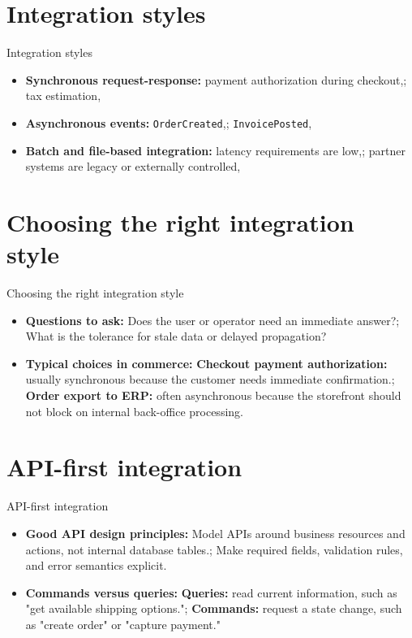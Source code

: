 \documentclass[aspectratio=169]{beamer}
\begin{document}
\section{Integration styles}

\begin{frame}{Integration styles}
  \begin{itemize}
    \item \textbf{Synchronous request-response:} payment authorization during checkout,; tax estimation,
    \item \textbf{Asynchronous events:} \texttt{OrderCreated},; \texttt{InvoicePosted},
    \item \textbf{Batch and file-based integration:} latency requirements are low,; partner systems are legacy or externally controlled,
  \end{itemize}
\end{frame}

\section{Choosing the right integration style}

\begin{frame}{Choosing the right integration style}
  \begin{itemize}
    \item \textbf{Questions to ask:} Does the user or operator need an immediate answer?; What is the tolerance for stale data or delayed propagation?
    \item \textbf{Typical choices in commerce:} \textbf{Checkout payment authorization:} usually synchronous because the customer needs immediate confirmation.; \textbf{Order export to ERP:} often asynchronous because the storefront should not block on internal back-office processing.
  \end{itemize}
\end{frame}

\section{API-first integration}

\begin{frame}{API-first integration}
  \begin{itemize}
    \item \textbf{Good API design principles:} Model APIs around business resources and actions, not internal database tables.; Make required fields, validation rules, and error semantics explicit.
    \item \textbf{Commands versus queries:} \textbf{Queries:} read current information, such as "get available shipping options."; \textbf{Commands:} request a state change, such as "create order" or "capture payment."
  \end{itemize}
\end{frame}
\end{document}
